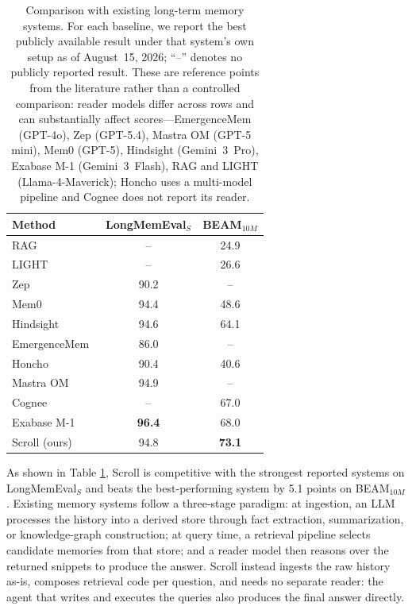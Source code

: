 \begin{table}[t]
\centering
\caption{Comparison with existing long-term memory systems. For each baseline, we report the best publicly available result under that system's own setup as of August~15, 2026; ``–'' denotes no publicly reported result. These are reference points from the literature rather than a controlled comparison: reader models differ across rows and can substantially affect scores---EmergenceMem (GPT-4o), Zep (GPT-5.4), Mastra OM (GPT-5 mini), Mem0 (GPT-5), Hindsight (Gemini~3~Pro), Exabase M-1 (Gemini~3~Flash), RAG and LIGHT (Llama-4-Maverick); Honcho uses a multi-model pipeline and Cognee does not
report its reader.}
\label{tab:memory-results}
\small
\begin{tabular}{lcc}
\toprule
Method & LongMemEval$_S$ & BEAM$_{10M}$ \\
\midrule
RAG~\citep{beam}                     & --   & 24.9 \\
LIGHT~\citep{beam}                   & --   & 26.6 \\
\midrule
Zep~\citep{zep-research}             & 90.2 & --   \\
Mem0~\citep{mem0,mem0-eval}          & 94.4 & 48.6 \\
Hindsight~\citep{hindsight}          & 94.6 & 64.1 \\
EmergenceMem~\citep{emergencemem}    & 86.0 & --   \\
Honcho~\citep{honcho}                & 90.4 & 40.6 \\
Mastra OM~\citep{mastra}             & 94.9 & --   \\
Cognee~\citep{cognee-beam}           & --   & 67.0 \\
Exabase M-1~\citep{exabase}          & \textbf{96.4} & 68.0 \\
\midrule
Scroll (ours)                        & 94.8 & \textbf{73.1} \\
\bottomrule
\end{tabular}
\end{table}

As shown in Table \ref{tab:memory-results}, Scroll is competitive with the strongest reported systems on LongMemEval$_S$ and beats the best-performing system by 5.1 points on BEAM$_{10M}$. Existing memory systems follow a three-stage paradigm: at ingestion, an LLM processes the history into a derived store through fact extraction, summarization, or knowledge-graph construction; at query time, a retrieval pipeline selects candidate memories from that store; and a reader model then reasons over the returned snippets to produce the answer. Scroll instead ingests the raw history as-is, composes retrieval code per question, and needs no separate reader: the agent that writes and executes the queries also produces the final answer directly. 

